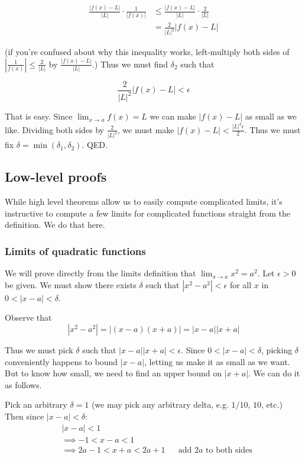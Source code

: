 \begin{align*}
  \frac{|f(x)-L|}{|L|}\cdot\frac{1}{|f(x)|}&\leq\frac{|f(x)-L|}{|L|}\cdot\frac{2}{|L|}\\
                                       &=\frac{2}{|L|^2}|f(x)-L|
\end{align*}

(if you're confused about why this inequality works, left-multiply both sides of
$|\frac{1}{f(x)}|\leq \frac{2}{|L|}$ by $\frac{|f(x)-L|}{|L|}$.) Thus we
must find $\delta_2$ such that

\[\frac{2}{|L|^2}|f(x)-L|<\epsilon\]

That is easy. Since $\lim_{x\to a}f(x)=L$ we can make $|f(x)-L|$ as
small as we like. Dividing both sides by $\frac{2}{|L|^2}$, we must
make $|f(x)-L|<\frac{|L|^2\epsilon}{2}$. Thus we must fix
$\delta=\min(\delta_1, \delta_2)$. QED.

\subsection{Low-level proofs}

While high level theorems allow us to easily compute complicated
limits, it's instructive to compute a few limits for complicated
functions straight from the definition. We do that here.

\subsubsection*{Limits of quadratic functions}

We will prove directly from the limits definition that
$\lim_{x\to a}x^2=a^2$. Let $\epsilon>0$ be given. We must show there exists
$\delta$ such that $|x^2-a^2|<\epsilon$ for all $x$ in $0<|x-a|<\delta$.

\vs

Observe that
\[|x^2-a^2|=|(x-a)(x+a)|=|x-a||x+a|\]

Thus we must pick $\delta$ such that $|x-a||x+a|<\epsilon$. Since
$0<|x-a|<\delta$, picking $\delta$ conveniently happens to bound
$|x-a|$, letting us make it as small as we want. But to know how
small, we need to find an upper bound on $|x+a|$. We can do it as
follows.

\vs

Pick an arbitrary $\delta=1$ (we may pick any arbitrary delta, e.g. $1/10$,
$10$, etc.) Then since $|x-a|<\delta$:
\begin{align*}
    &|x-a|<1\\
    &\implies -1<x-a<1\\
    &\implies 2a-1<x+a<2a+1&&\text{add $2a$ to both sides}
\end{align*}

